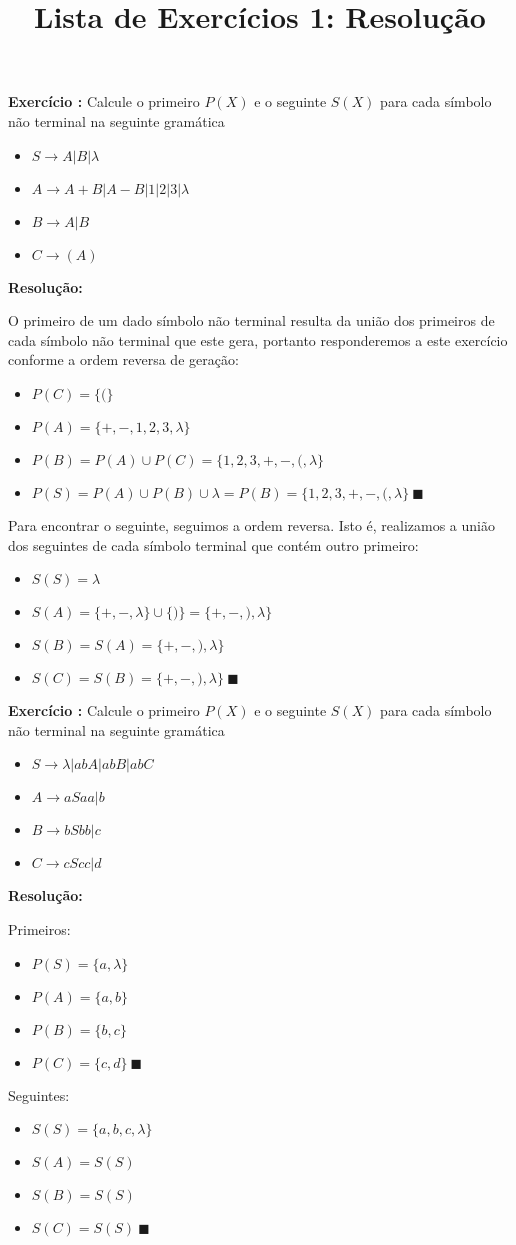 \documentclass[a4paper]{article}
\title{Lista de Exercícios 1: Resolução}
\author{
    \addauthor{Guilherme de Abreu}{12543033} 
    \addauthor{Hélio Cardoso}{10310227} 
    \addauthor{Laura Camargos}{13692334}
    \addauthor{Sandy Dutra}{12544570}
    \addauthor{Theo dos Santos}{10691331}
}
\newcounter{count}
\newcommand{\exercise}[2]{%
  \stepcounter{count}%
  \noindent\textbf{Exercício \thecount:} Calcule o primeiro $P(X)$ e o seguinte $S(X)$ para cada símbolo não terminal na seguinte gramática
%
  \vspace{\baselineskip}%
  \begin{itemize}
    #1
  \end{itemize}
  \vspace{\baselineskip}%
  \noindent\textbf{Resolução:}%
  \vspace{\baselineskip}%
  
  #2 
  \vspace{2\baselineskip}%
}
\begin{document}
\maketitle

\exercise {
	\item $S \rightarrow A | B | \lambda$
	\item $A \rightarrow A + B | A - B | 1 | 2 | 3 | \lambda$
	\item $B \rightarrow A | B$
	\item $C \rightarrow (A)$
} {
	O primeiro de um dado símbolo não terminal resulta da união dos primeiros de cada símbolo não terminal que este gera, portanto responderemos a este exercício conforme a ordem reversa de geração:

	\begin{itemize}
		\item $P(C) = \{(\}$
		\item $P(A) = \{+, -, 1, 2, 3, \lambda \}$
		\item $P(B) = P(A) \cup P(C) = \{ 1, 2, 3, +, -, (, \lambda \}$
		\item $P(S) = P(A) \cup P(B) \cup \lambda = P(B) = \{ 1, 2, 3, +, -, (, \lambda \}\ \blacksquare$
	\end{itemize}

	Para encontrar o seguinte, seguimos a ordem reversa. Isto é, realizamos a união dos seguintes de cada símbolo terminal que contém outro primeiro:

	\begin{itemize}
		\item $S(S) = {\lambda}$
		\item $S(A) = \{+, -, \lambda \} \cup \{)\} = \{+, -, ), \lambda\}$
		\item $S(B) = S(A) = \{+, -, ), \lambda\}$
		\item $S(C) = S(B) =  \{+, -, ), \lambda\}\ \blacksquare$
	\end{itemize}
}

\exercise {
	\item $S \rightarrow \lambda | abA | abB | abC$
	\item $A \rightarrow aSaa | b$
	\item $B \rightarrow bSbb | c$
	\item $C \rightarrow cScc | d$
} {
	Primeiros:
	\begin{itemize}
		\item $P(S) = \{a, \lambda\}$
		\item $P(A) = \{a, b\}$
		\item $P(B) = \{b, c\}$
		\item $P(C) = \{c, d\}\ \blacksquare$
	\end{itemize}

	Seguintes:
	\begin{itemize}
		\item $S(S) = \{a, b, c, \lambda\}$
		\item $S(A) = S(S)$
		\item $S(B) = S(S)$
		\item $S(C) = S(S)\ \blacksquare$
	\end{itemize}

}
\end{document}
